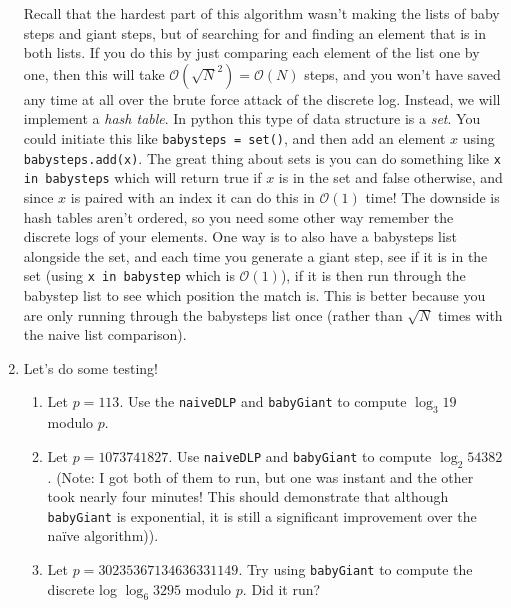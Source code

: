 \documentclass[11pt]{article}
\newcommand{\cO}{\mathcal{O}}
\begin{document}
\begin{enumerate}
{\begin{itemize}
{    Recall that the hardest part of this algorithm wasn't making the lists of baby steps and giant steps, but of searching for and finding an element that is in both lists.  If you do this by just comparing each element of the list one by one, then this will take $\cO(\sqrt N^2) = \cO(N)$ steps, and you won't have saved any time at all over the brute force attack of the discrete log.  Instead, we will implement a \textit{hash  table}.  In python this type of data structure is a \textit{set}.  You could initiate this like \verb|babysteps = set()|, and then add an element $x$ using \verb|babysteps.add(x)|.  The great thing about sets is you can do something like \verb|x in babysteps| which will return true if $x$ is in the set and false otherwise, and since $x$ is paired with an index it can do this in $\cO(1)$ time!  The downside is hash tables aren't ordered, so you need some other way remember the discrete logs of your elements.  One way is to also have a babysteps list alongside the set, and each time you generate a giant step, see if it is in the set (using \verb|x in babystep| which is $\cO(1)$), if it is then run through the babystep list to see which position the match is.  This is better because you are only running through the babysteps list once (rather than $\sqrt N$ times with the naive list comparison).
    }
  \end{itemize}
  }
  \item{
  Let's do some testing!
  \begin{enumerate}
    \item{
    Let $p = 113$.  Use the \verb|naiveDLP| and \verb|babyGiant| to compute $\log_3 19$ modulo $p$.
    }
    \item{
    Let $p = 1073741827$.  Use \verb|naiveDLP| and \verb|babyGiant| to compute $\log_2 54382$.  (Note: I got both of them to run, but one was instant and the other took nearly four minutes!  This should demonstrate that although \verb|babyGiant| is exponential, it is still a significant improvement over the na\"ive algorithm)).
    }
    \item{
    Let $p = 30235367134636331149$.  Try using \verb|babyGiant| to compute the discrete log $\log_6 3295$ modulo $p$.  Did it run?
    }
  \end{enumerate}
  }
\end{enumerate}
\end{document}
